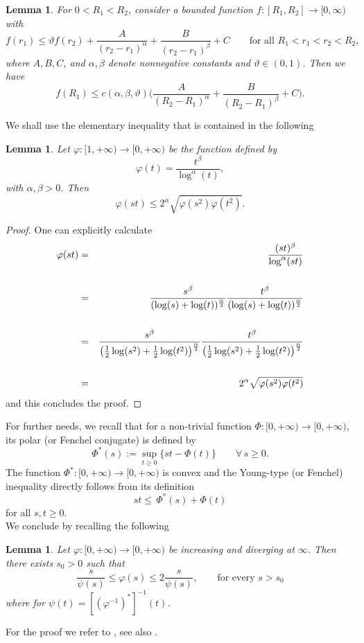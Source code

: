 \documentclass[12pt]{amsart}
\newtheorem{lemma}[theorem]{Lemma}
\theoremstyle{definition}
\numberwithin{equation}{section}
\numberwithin{equation}{section}
\begin{document}
{  \begin{lemma}\label{lem:Giaq}
    For $0<R_1<R_2$, consider a bounded function
    $f:[R_1,R_2]\to[0,\infty)$ with
    \begin{equation*}
      f(r_1)\le\vartheta f(r_2)+\frac A{(r_2-r_1)^\alpha}+ \frac B{(r_2-r_1)^\beta}+ C
       \qquad\mbox{for all }R_1<r_1<r_2<R_2,
    \end{equation*}
    where $A,B,C$, and $\alpha,\beta$ denote nonnegative constants
    and $\vartheta\in(0,1)$. Then we have
    \begin{equation*}
      f(R_1)\le c(\alpha,\beta,\vartheta)
      \bigg(\frac A{(R_2-R_1)^\alpha}+\frac B{(R_2-R_1)^\beta}+C
      \bigg).
    \end{equation*}
  \end{lemma}
  We shall use the elementary inequality that is contained in the following 
\begin{lemma}\label{elem1} Let $\varphi:{[1,+\infty)}\to [0,+\infty)$ be the function defined by
$$ \varphi(t)=\frac{t^\beta}{\log^{\alpha}(t)},$$
with $\alpha,\beta>0$. Then
$$\varphi(st)\le 2^{\alpha}\sqrt{\varphi(s^2)\varphi(t^2)}.$$
\end{lemma}
\begin{proof} One can explicitly calculate
\begin{eqnarray*}
  \varphi(st)&=& {\frac{(st)^\beta}{\log^{\alpha}(st)}}\cr\cr 
  &=&\frac{s^\beta}{(\log(s)+\log(t))^{\frac{\alpha}{2}}}\frac{t^\beta}{(\log(s)+\log(t))^{\frac{\alpha}{2}}}\cr\cr 
  &=&\frac{s^\beta}{\left(\frac12\log(s^2)+\frac12\log(t^2)\right)^{\frac{\alpha}{2}}}\frac{t^\beta}{\left(\frac12\log(s^2)+\frac12\log(t^2)\right)^{\frac{\alpha}{2}}}\cr\cr 
  &=&2^{\alpha}\sqrt{\varphi(s^2)\varphi(t^2)} 
\end{eqnarray*}
and this concludes the proof.
\end{proof}
\color{black}
For further needs, we recall that for a non-trivial function $\Phi:[0,+\infty)\to [0,+\infty)$,
its polar (or Fenchel conjugate)  is defined by
\begin{equation}
\label{Fconiug}
\Phi^*(s) := \sup_{t \ge 0} \big \{st - \Phi(t) \big \} \qquad {\forall \,}s\ge 0.
\end{equation}
The function $\Phi^*: [0,+\infty) \rightarrow [0,+\infty)$ is convex and   the Young-type (or Fenchel) inequality   directly follows from its  definition
\begin{equation}
\label{Fenchel}
st \le \, \Phi^*(s) + {\Phi(t)}
\end{equation}
for all $s,t\ge 0$.
\\
We conclude by recalling the  following
\begin{lemma}\label{GGP} Let $\varphi:[0,+\infty)\to [0,+\infty)$ be  increasing and diverging at $\infty$. Then there exists $s_0>0$ such that 
$$\frac{s}{\psi(s)}\le \varphi(s)\le 2\frac{s}{\psi(s)},\qquad \text{for every } s>s_0$$
where for $\psi(t)=[(\varphi^{-1})^*]^{-1}(t)$.
\end{lemma}
For the proof we refer to \cite[Lemma 2.4]{GGP}, see also \cite[Lemma 2.1]{GianGrePas}.
}
\end{document}
